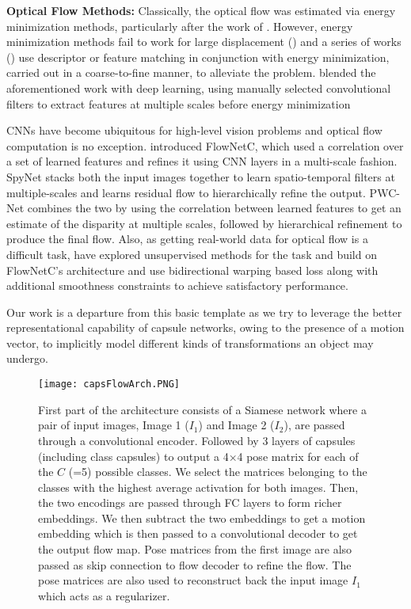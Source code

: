 \documentclass[11pt]{article}
\begin{document}
\textbf{Optical Flow Methods:}  Classically, the optical flow was estimated via energy minimization methods, particularly after the work of \cite{6}. However, energy minimization methods fail to work for large displacement (\cite{2}) and a series of works (\cite{1, 10, 18}) use descriptor or feature matching in conjunction with energy minimization, carried out in a coarse-to-fine manner, to alleviate the problem. \cite{17} blended the aforementioned work with deep learning, using manually selected convolutional filters to extract features at multiple scales before energy minimization

CNNs have become ubiquitous for high-level vision
problems and optical flow computation is no exception.
\cite{3} introduced FlowNetC, which used a correlation over a set of learned features and refines it using CNN layers in a multi-scale fashion. SpyNet \cite{12} stacks
both the input images together to learn spatio-temporal filters at multiple-scales and learns residual flow to hierarchically refine the output. PWC-Net \cite{15} combines the two
by using the correlation between learned features to get an
estimate of the disparity at multiple scales, followed by hierarchical refinement to produce the final flow. Also, as
getting real-world data for optical flow is a difficult task,
\cite{11, 16, 20} have explored unsupervised methods for the
task and build on FlowNetC’s architecture and use bidirectional warping based loss along with additional smoothness
constraints to achieve satisfactory performance.

Our work is a departure from this basic template as we
try to leverage the better representational capability of capsule networks, owing to the presence of a motion vector, to
implicitly model different kinds of transformations an object may undergo.

\begin{figure*}
\centering
\texttt{[image: capsFlowArch.PNG]}
\caption{First part of the architecture consists of a Siamese network where a pair of input images, Image 1 (\(I_{1}\)) and Image
2 (\(I_{2}\)), are passed through a convolutional encoder. Followed by 3 layers of capsules (including class capsules) to output a
4×4 pose matrix for each of the \(C\) (=5) possible classes. We select the matrices belonging to the classes with the highest
average activation for both images. Then, the two encodings are passed through FC layers to form richer embeddings. We
then subtract the two embeddings to get a motion embedding which is then passed to a convolutional decoder to get the output
flow map. Pose matrices from the first image are also passed as skip connection to flow decoder to refine the flow. The pose matrices are also used to reconstruct back the input image \(I_{1}\) which acts as a regularizer.}
\end{figure*}
\end{document}
